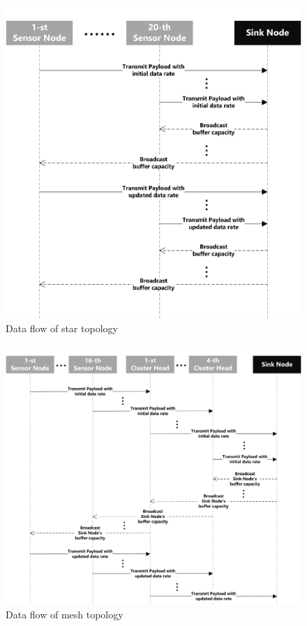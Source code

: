 \newpage
\vspace*{1.5 cm}
\begin{figure}
	\centering
	\includegraphics[width=1\linewidth]{pics/UntitledDiagram}
	\caption{Data flow of star topology}
	\label{fig:untitled-diagram}
\end{figure}



\begin{figure}
	\centering
	\includegraphics[width=1\linewidth]{pics/UntitledDiagram2}
	\caption{Data flow of mesh topology}
	\label{fig:untitled-diagram2}
\end{figure}


